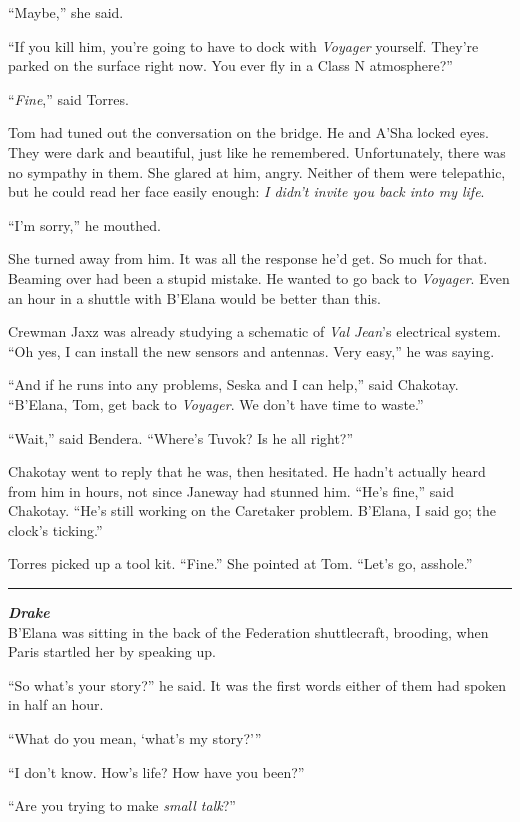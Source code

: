 \documentclass[twoside,letterpaper,12pt]{memoir}
\begin{document}
``Maybe,'' she said.

``If you kill him, you're going to have to dock with \textit{Voyager} yourself. They're parked on the surface right now. You ever fly in a Class N atmosphere?''

``\textit{Fine},'' said Torres.

Tom had tuned out the conversation on the bridge. He and A'Sha locked eyes. They were dark and beautiful, just like he remembered. Unfortunately, there was no sympathy in them. She glared at him, angry. Neither of them were telepathic, but he could read her face easily enough: \textit{I didn't invite you back into my life}.

``I'm sorry,'' he mouthed.

She turned away from him. It was all the response he'd get. So much for that. Beaming over had been a stupid mistake. He wanted to go back to \textit{Voyager}. Even an hour in a shuttle with B'Elana would be better than this.

Crewman Jaxz was already studying a schematic of \textit{Val Jean}'s electrical system. ``Oh yes, I can install the new sensors and antennas. Very easy,'' he was saying.

``And if he runs into any problems, Seska and I can help,'' said Chakotay. ``B'Elana, Tom, get back to \textit{Voyager}. We don't have time to waste.''

``Wait,'' said Bendera. ``Where’s Tuvok? Is he all right?''

Chakotay went to reply that he was, then hesitated. He hadn’t actually heard from him in hours, not since Janeway had stunned him. ``He's fine,'' said Chakotay. ``He's still working on the Caretaker problem. B'Elana, I said go; the clock's ticking.''

Torres picked up a tool kit. ``Fine.'' She pointed at Tom. ``Let's go, asshole.''

\fancybreak{\rule{3cm}{0.4 pt}}
\noindent\textit{\textbf{Drake}}\\

B'Elana was sitting in the back of the Federation shuttlecraft, brooding, when Paris startled her by speaking up.

``So what's your story?'' he said. It was the first words either of them had spoken in half an hour.

``What do you mean, `what's my story?'''

``I don't know. How's life? How have you been?''

``Are you trying to make \textit{small talk}?''
\end{document}
